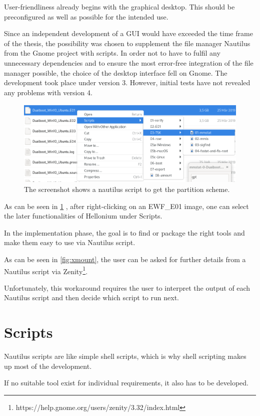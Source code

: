 User-friendliness already begins with the graphical desktop. This should be preconfigured as well as possible for the intended use.

Since an independent development of a GUI would have exceeded the time frame of the thesis, the possibility was chosen to supplement the file manager Nautilus from the Gnome project with scripts. In order not to have to fulfil any unnecessary dependencies and to ensure the most error-free integration of the file manager possible, the choice of the desktop interface fell on Gnome. The development took place under version 3. However, initial tests have not revealed any problems with version 4.

\begin{figure}[htbp]  %
  \centering
  \includegraphics[width=.5\textwidth]{figures/mmstat-gpt.png}
  \caption[Nautilus script example]{The screenshot shows a nautilus script to get the partition scheme.}
  \label{fig:NautilusScript}
\end{figure}

As can be seen in \cref{fig:NautilusScript} , after right-clicking on an EWF\_E01 image, one can select the later functionalities of Hellonium under Scripts.

In the implementation phase, the goal is to find or package the right tools and make them easy to use via Nautilus script.

As can be seen in \cref{fig:xmount}, the user can be asked for further details from a Nautilus script via Zenity\footnote{https://help.gnome.org/users/zenity/3.32/index.html}.

Unfortunately, this workaround requires the user to interpret the output of each Nautilus script and then decide which script to run next.

\section{Scripts}

Nautilus scripts are like simple shell scripts, which is why shell scripting makes up most of the development.

If no suitable tool exist for individual requirements, it also has to be developed.

